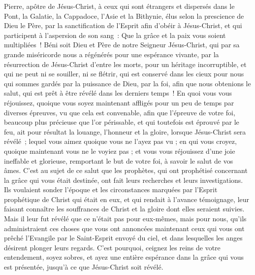 \begin{multicols}{2}
\VerseOne{}Pierre, apôtre de Jésus-Christ, à ceux qui sont étrangers et dispersés dans le Pont, la Galatie, la Cappadoce, l'Asie et la Bithynie,
élus selon la prescience de Dieu le Père, par la sanctification de l'Esprit afin d'obéir à Jésus-Christ, et qui participent à l'aspersion de son sang~: Que la grâce et la paix vous soient multipliées~!
Béni soit Dieu et Père de notre Seigneur Jésus-Christ, qui par sa grande miséricorde nous a régénérés pour une espérance vivante, par la résurrection de Jésus-Christ d'entre les morts,
pour un héritage incorruptible, et qui ne peut ni se souiller, ni se flétrir, qui est conservé dans les cieux pour nous
qui sommes gardés par la puissance de Dieu, par la foi, afin que nous obtenions le salut, qui est prêt à être révélé dans les derniers temps~!
En quoi vous vous réjouissez, quoique vous soyez maintenant affligés pour un peu de temps par diverses épreuves, vu que cela est convenable,
afin que l'épreuve de votre foi, beaucoup plus précieuse que l'or périssable, et qui toutefois est éprouvé par le feu, ait pour résultat la louange, l'honneur et la gloire, lorsque Jésus-Christ sera révélé~;
lequel vous aimez quoique vous ne l'ayez pas vu ; en qui vous croyez, quoique maintenant vous ne le voyiez pas ; et vous vous réjouissez d'une joie ineffable et glorieuse,
remportant le but de votre foi, à savoir le salut de vos âmes.
C'est au sujet de ce salut que les prophètes, qui ont prophétisé concernant la grâce qui vous était destinée, ont fait leurs recherches et leurs investigations.
Ils voulaient sonder l'époque et les circonstances marquées par l'Esprit prophétique de Christ qui était en eux, et qui rendait à l'avance témoignage, leur faisant connaître les souffrances de Christ et la gloire dont elles seraient suivies.
Mais il leur fut révélé que ce n'était pas pour eux-mêmes, mais pour nous, qu'ils administraient ces choses que vous ont annoncées maintenant ceux qui vous ont prêché l'Evangile par le Saint-Esprit envoyé du ciel, et dans lesquelles les anges désirent plonger leurs regards.
C'est pourquoi, ceignez les reins de votre entendement, soyez sobres, et ayez une entière espérance dans la grâce qui vous est présentée, jusqu'à ce que Jésus-Christ soit révélé.

\end{multicols}
